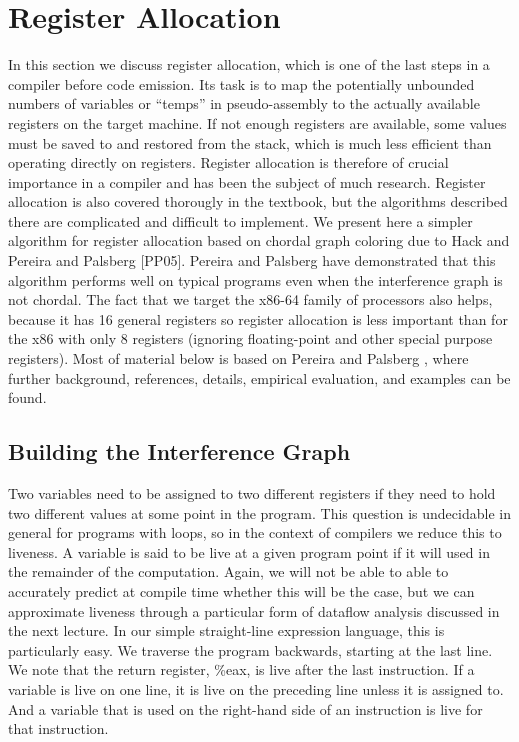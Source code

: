 \newpage

\section{Register Allocation}

In this section we discuss register allocation, which is one of the last steps
in a compiler before code emission. Its task is to map the potentially unbounded numbers of variables or “temps” in pseudo-assembly to the actually available registers on the target machine. If not enough registers are
available, some values must be saved to and restored from the stack, which
is much less efficient than operating directly on registers. Register allocation is therefore of crucial importance in a compiler and has been the subject of much research. Register allocation is also covered thorougly in the
textbook, but the algorithms described there are complicated and difficult to implement. We present here a simpler algorithm
for register allocation based on chordal graph coloring due to Hack \cite{hack2006register}
and Pereira and Palsberg [PP05]. Pereira and Palsberg have demonstrated
that this algorithm performs well on typical programs even when the interference graph is not chordal. The fact that we target the x86-64 family
of processors also helps, because it has 16 general registers so register allocation is less important than for the x86 with only 8 registers (ignoring
floating-point and other special purpose registers).
Most of material below is based on Pereira and Palsberg \cite{pereira2005register}, where
further background, references, details, empirical evaluation, and examples can be found.

\subsection{Building the Interference Graph}

Two variables need to be assigned to two different registers if they need to
hold two different values at some point in the program. This question is
undecidable in general for programs with loops, so in the context of compilers we reduce this to liveness. A variable is said to be live at a given
program point if it will used in the remainder of the computation. Again,
we will not be able to able to accurately predict at compile time whether
this will be the case, but we can approximate liveness through a particular form of dataflow analysis discussed in the next lecture. In our simple
straight-line expression language, this is particularly easy. We traverse the
program backwards, starting at the last line. We note that the return register, \%eax, is live after the last instruction. If a variable is live on one line, it
is live on the preceding line unless it is assigned to. And a variable that is
used on the right-hand side of an instruction is live for that instruction.

